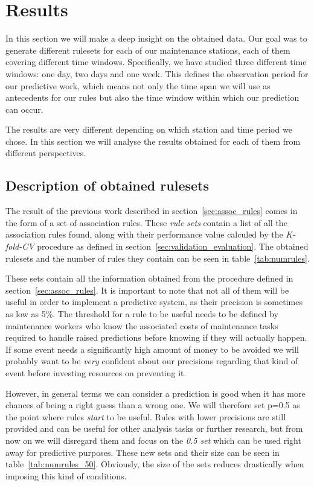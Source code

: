 \clearpage
\section{Results}
\label{sec:results}
In this section we will make a deep insight on the obtained data. Our goal was to generate different rulesets for each of our maintenance stations, each of them covering different time windows. Specifically, we have studied three different time windows: one day, two days and one week. This defines the observation period for our predictive work, which means not only the time span we will use as antecedents for our rules but also the time window within which our prediction can occur.

The results are very different depending on which station and time period we chose. In this section we will analyse the results obtained for each of them from different perspectives.

\subsection{Description of obtained rulesets}
\label{sec:desc_results}
The result of the previous work described in section~\ref{sec:assoc_rules} comes in the form of a set of association rules. These \emph{rule sets} contain a list of all the association rules found, along with their performance value calculed by the \emph{K-fold-CV} procedure as defined in section~\ref{sec:validation_evaluation}. The obtained rulesets and the number of rules they contain can be seen in table~\ref{tab:numrules}.

These sets contain all the information obtained from the procedure defined in section~\ref{sec:assoc_rules}. It is important to note that not all of them will be useful in order to implement a predictive system, as their precision is sometimes as low as 5\%. The threshold for a rule to be useful needs to be defined by maintenance workers who know the associated costs of maintenance tasks required to handle raised predictions before knowing if they will actually happen. If some event needs a significantly high amount of money to be avoided we will probably want to be \emph{very} confident about our precisions regarding that kind of event before investing resources on preventing it.

However, in general terms we can consider a prediction is good when it has more chances of being a right guess than a wrong one. We will therefore set p=0.5 as the point where rules \emph{start} to be useful. Rules with lower precisions are still provided and can be useful for other analysis tasks or further research, but from now on we will disregard them and focus on the \emph{0.5 set} which can be used right away for predictive purposes. These new sets and their size can be seen in table~\ref{tab:numrules_50}. Obviously, the size of the sets reduces drastically when imposing this kind of conditions.

